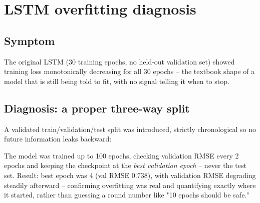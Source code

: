 \documentclass[11pt]{article}
\begin{document}
\section{LSTM overfitting diagnosis}
\label{sec:overfitting}

\subsection{Symptom}
The original LSTM (30 training epochs, no held-out validation set) showed training loss
monotonically decreasing for all 30 epochs -- the textbook shape of a model that is
still being told to fit, with no signal telling it when to stop.

\subsection{Diagnosis: a proper three-way split}
A validated train/validation/test split was introduced, strictly chronological so no
future information leaks backward:

\begin{center}
\end{center}

The model was trained up to 100 epochs, checking validation RMSE every 2 epochs and
keeping the checkpoint at the \emph{best validation epoch} -- never the test set. Result:
best epoch was 4 (val RMSE 0.738), with validation RMSE degrading steadily afterward --
confirming overfitting was real and quantifying exactly where it started, rather than
guessing a round number like "10 epochs should be safe."
\end{document}
